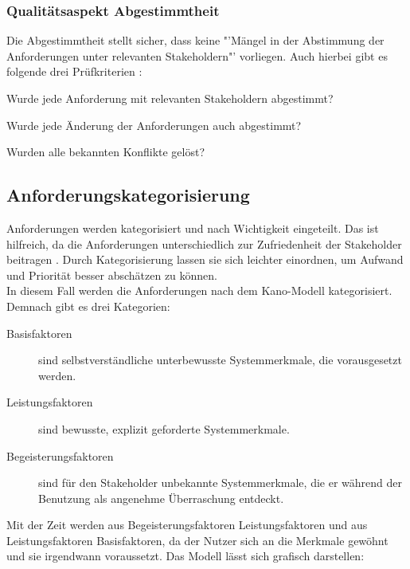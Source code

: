 \documentclass [12pt, a4paper, oneside, titlepage, ngerman]{article}
\begin{document}
\subsubsection{Qualitätsaspekt Abgestimmtheit}
Die Abgestimmtheit stellt sicher, dass keine "'Mängel in der Abstimmung der Anforderungen unter relevanten Stakeholdern"'\cite[S.100]{PohlRupp2015} vorliegen. Auch hierbei gibt es folgende drei Prüfkriterien\cite[vgl. S.100]{PohlRupp2015} :
\begin{description}[font=\itshape]\setlength\itemsep{0em}
\item[Abstimmung:] Wurde jede Anforderung mit relevanten Stakeholdern abgestimmt?
\item[Abstimmung nach Änderungen:] Wurde jede Änderung der Anforderungen auch abgestimmt?
\item[Konflikte:] Wurden alle bekannten Konflikte gelöst?
\end{description}

\subsection{Anforderungskategorisierung}
Anforderungen werden kategorisiert und nach Wichtigkeit eingeteilt. Das ist hilfreich, da die Anforderungen unterschiedlich zur Zufriedenheit der Stakeholder beitragen\cite[vgl. S.24]{PohlRupp2015} . Durch Kategorisierung lassen sie sich leichter einordnen, um Aufwand und Priorität besser abschätzen zu können. \\
In diesem Fall werden die Anforderungen nach dem Kano-Modell kategorisiert. Demnach gibt es drei Kategorien\cite[vgl. S.24]{PohlRupp2015}:
\begin{description} 
\item[Basisfaktoren] sind selbstverständliche unterbewusste Systemmerkmale, die vorausgesetzt werden. 
\item[Leistungsfaktoren] sind bewusste, explizit geforderte Systemmerkmale.
\item[Begeisterungsfaktoren] sind für den Stakeholder unbekannte Systemmerkmale, die er während der Benutzung als angenehme Überraschung entdeckt.
\end{description}
Mit der Zeit werden aus Begeisterungsfaktoren Leistungsfaktoren und aus Leistungsfaktoren Basisfaktoren, da der Nutzer sich an die Merkmale gewöhnt und sie irgendwann voraussetzt. Das Modell lässt sich grafisch darstellen: 
\end{document}
